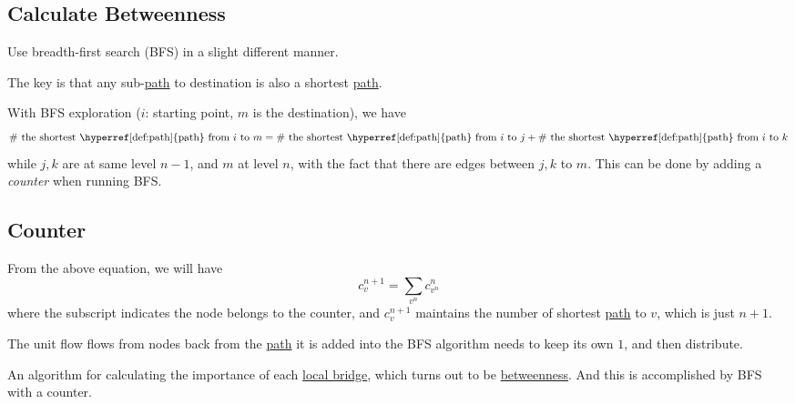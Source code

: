 \subsection{Calculate Betweenness}
\begin{intuition}
	Use breadth-first search (BFS) in a slight different manner.
\end{intuition}
\begin{remark}
	The key is that any sub-\hyperref[def:path]{path} to destination is also a shortest \hyperref[def:path]{path}.
\end{remark}

With BFS exploration (\(i\): starting point, \(m\) is the destination), we have
\[
	\#\text{ the shortest \hyperref[def:path]{path} from \(i\) to \(m\)} =  \#\text{ the shortest \hyperref[def:path]{path} from \(i\) to \(j\)} +
	\#\text{ the shortest \hyperref[def:path]{path} from \(i\) to \(k\)}
\]
while \(j, k\) are at same level \(n-1\), and \(m\) at level \(n\), with the fact that there are edges between \(j, k\) to \(m\). This can be done by adding a \emph{counter} when
running BFS.

\subsection{Counter}
From the above equation, we will have
\[
	c_{v}^{n+1} = \sum_{v^n}c^n_{v^n}
\]
where the subscript indicates the node belongs to the counter, and \(c_v^{n+1}\) maintains the number of shortest \hyperref[def:path]{path} to \(v\), which is just \(n+1\).

The unit flow flows from nodes back from the \hyperref[def:path]{path} it is added into the BFS algorithm needs to keep its own \(1\), and then distribute.

\begin{remark}
	An algorithm for calculating the importance of each \hyperref[def:local-bridge]{local bridge}, which turns out to be \hyperref[def:betweenness]{betweenness}.
	And this is accomplished by BFS with a counter.
\end{remark}